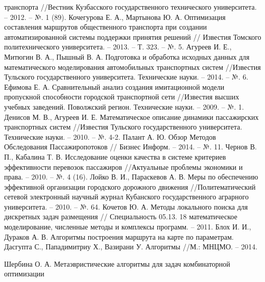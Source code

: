 \begin{thebibliography}{10}
        транспорта //Вестник Кузбасского государственного технического университета. -- 2012. -- №. 1 (89).
     Кочегурова Е. А., Мартынова Ю. А. Оптимизация составления маршрутов общественного 
        транспорта при создании автоматизированной системы поддержки принятия решений //
        Известия Томского политехнического университета. -- 2013. -- Т. 323. -- №. 5.
     Агуреев И. Е., Митюгин В. А., Пышный В. А. Подготовка и обработка исходных данных 
        для математического моделирования автомобильных транспортных систем //Известия Тульского 
        государственного университета. Технические науки. -- 2014. -- №. 6.
     Ефимова Е. А. Сравнительный анализ создания имитационной модели пропускной 
        способности городской транспортной сети //Известия высших учебных заведений. Поволжский регион. 
        Технические науки. -- 2009. -- №. 1.
     Денисов М. В., Агуреев И. Е. Математическое описание динамики пассажирских 
        транспортных систем //Известия Тульского государственного университета. 
        Технические науки. -- 2010. -- №. 4-2.
     Палант А. Ю. Обзор Методов Обследования Пассажиропотоков //
        Бизнес Информ. -- 2014. -- №. 11.
     Чернов В. П., Кабалина Т. В. Исследование оценки качества в системе критериев 
        эффективности перевозок пассажиров //Актуальные проблемы экономики и права. -- 2010. -- №. 4 (16).
     Лойко В. И., Параскевов А. В. Меры по обеспечению эффективной организации городского 
        дорожного движения //Политематический сетевой электронный научный журнал Кубанского 
        государственного аграрного университета. -- 2010. -- №. 64.
     Кочетов Ю. А. Методы локального поиска для дискретных задач размещения //
        Специальность 05.13. 18 математическое моделирование, численные методы и 
        комплексы программ. -- 2011.
     Блох И. И., Дураков А. В. Алгоритмы построения маршрута на карте по параметрам.
     Дасгупта С., Пападимитриу Х., Вазирани У. Алгоритмы //М.: МНЦМО. -- 2014.
    
     Шербина О. А. Метаэвристические алгоритмы для задач комбинаторной оптимизации 
    

\end{thebibliography}
